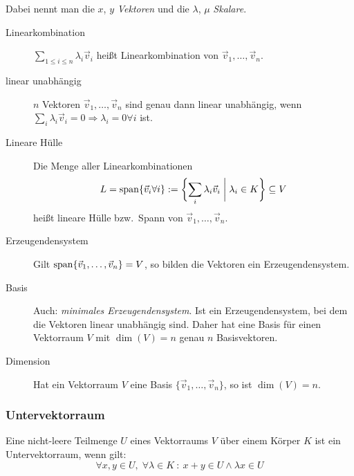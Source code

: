 Dabei nennt man die $x$, $y$ \emph{Vektoren} und die $\lambda$, $\mu$ \emph{Skalare}.
\begin{description}
  \item [Linearkombination]
        $\sum_{1 \leq i \leq n} \lambda_i \vec v_i$ heißt Linearkombination von $\vec v_1, \ldots, \vec v_n$.
  \item [linear unabhängig]
        $n$ Vektoren $\vec v_1, \ldots, \vec v_n$ sind genau dann linear unabhängig, wenn $\sum_i \lambda_i \vec v_i = 0 \Longrightarrow \lambda_i = 0 \forall i$ ist.
  \item [Lineare Hülle]
	Die Menge aller Linearkombinationen
	\[ L = \operatorname{span}\{\vec v_i \forall i\} := \biggl\{ \sum_i \lambda_i \vec v_i \biggm| \lambda_i \in K\biggr\} \subseteq V \]
	heißt lineare Hülle bzw.~Spann von $\vec{v}_{1},\ldots,\vec{v}_{n}$.
  \item [Erzeugendensystem]
	Gilt $\operatorname{span}\{\vec v_1,\ldots,\vec v_n\} = V$, so bilden die Vektoren ein Erzeugendensystem.
  \item [Basis]
	Auch: \emph{minimales Erzeugendensystem}.
	Ist ein Erzeugendensystem, bei dem die Vektoren linear unabhängig sind.
	Daher hat eine Basis für einen Vektorraum $V$ mit $\dim(V)=n$ genau $n$ Basisvektoren.
  \item [Dimension]
	Hat ein Vektorraum $V$ eine Basis $\{ \vec v_1,\ldots,\vec v_n\}$, so ist $\dim(V)=n$.
\end{description}

\subsubsection{Untervektorraum}

Eine nicht-leere Teilmenge $U$ eines Vektorraums $V$ über einem Körper $K$ ist ein Untervektorraum, wenn gilt:
\[ \forall x,y\in U,\; \forall\lambda\in K\ :\ x+y\in U\land\lambda x\in U \]

